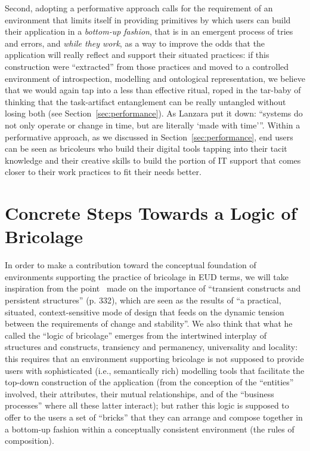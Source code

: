\documentclass{article}
\begin{document}
Second, adopting a performative approach calls for the requirement of an environment that limits itself in providing primitives by which users can build their application in a \emph{bottom-up fashion}, that is in an emergent process of tries and errors, and \emph{while they work}, as a way to improve the odds that the application will really reflect and support their situated practices: if this construction were ``extracted'' from those practices and moved to a controlled environment of introspection, modelling and ontological representation, we believe that we would again tap into a less than effective ritual, roped in the tar-baby of thinking that the task-artifact entanglement can be really untangled without losing both (see Section~\ref{sec:performance}). As Lanzara put it down: ``systems do not only operate or change in time, but are literally `made with time'''. Within a performative approach, as we discussed in Section~\ref{sec:performance}, end users can be seen as bricoleurs who build their digital tools tapping into their tacit knowledge and their creative skills to 
build the portion of IT support that comes closer to their work practices to fit their needs better. 



\section{Concrete Steps Towards a Logic of Bricolage}
\label{sec:environments}

In order to make a contribution toward the conceptual foundation of environments supporting the practice of bricolage in EUD terms, we will take inspiration from the point~\citet{lanzara_between_1999} made on the importance of ``transient constructs and persistent structures'' (p. 332), which are seen as the results of ``a practical, situated, context-sensitive mode of design that feeds on the dynamic tension between the requirements of change and stability''. We also think that what he called the ``logic of bricolage'' emerges from the intertwined interplay of structures and constructs, transiency and permanency, universality and locality: this  requires that an environment supporting bricolage is not supposed to provide users with sophisticated (i.e., semantically rich) modelling tools that facilitate the top-down construction of the application (from the conception of the ``entities'' involved, their attributes, their mutual relationships, and of the ``business processes'' where all these latter interact); but rather this logic is supposed to offer to the users a set of ``bricks'' that they can arrange and compose together in a bottom-up fashion within a conceptually consistent environment (the rules of composition).
\end{document}
